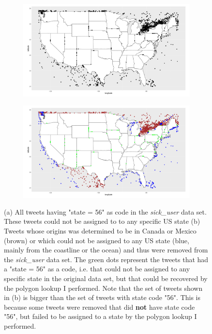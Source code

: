 \documentclass[11pt, a4paper]{article}\usepackage[]{graphicx}\usepackage[]{color}
\begin{document}
\begin{figure}[h]
  \centering
    \begin{subfigure}[t]{0.9\textwidth}
    \includegraphics[width=1\linewidth]{state56_sick_raw_df.png}
    \caption{}
    \label{fig:code56}
  \end{subfigure}
  \begin{subfigure}[t]{0.9\textwidth}
  \includegraphics[width=1\linewidth]{CanexicoAndRemoved_sick_raw_df.png}
  \caption{}
  \label{fig:canexico_and_removed}
  \end{subfigure}
  \caption{(a) All tweets having "state = 56" as code in the \textit{sick\_user} data set. These tweets could not be assigned to to any specific US state (b) Tweets whose origins was determined to be in Canada or Mexico (brown) or which could not be assigned to any US state (blue, mainly from the coastline or the ocean) and thus were removed from the \textit{sick\_user} data set. The green dots represent the tweets that had a "state = 56" as  a code, i.e. that could not be assigned to any specific state in the original data set, but that could be recovered by the polygon lookup I performed. Note that the set of tweets shown in (b) is bigger than the set of tweets with state code "56". This is because some tweets were removed that did \textbf{not} have state code "56", but failed to be assigned to a state by the polygon lookup I performed.}
  \end{figure}
\end{document}
